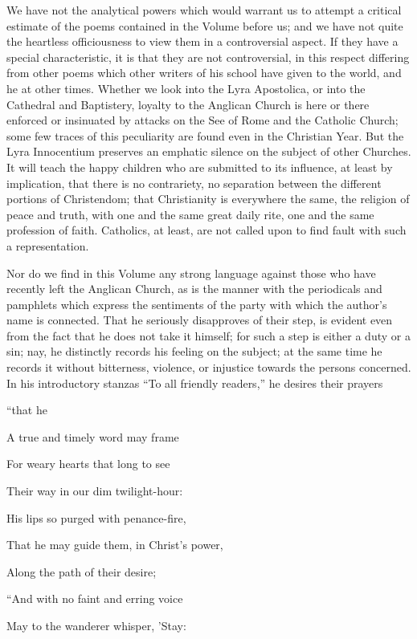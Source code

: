 We have not the analytical powers which would
warrant us to attempt a critical estimate of the poems contained in
the Volume before us; and we have not quite the heartless
officiousness to view them in a controversial aspect. If they have a
special characteristic, it is that they are not controversial, in this
respect differing from other poems which other writers of his school
have given to the world, and he at other times. Whether we look into
the Lyra Apostolica, or into the Cathedral and Baptistery, loyalty to
the Anglican Church is here or there enforced or insinuated by attacks
on the See of Rome and the Catholic Church; some few traces of this
peculiarity are found even in the Christian Year. But the Lyra
Innocentium preserves an emphatic silence on the subject of other
Churches. It will teach the happy children who are submitted to its
influence, at least by implication, that there is no contrariety, no
separation between the different portions of Christendom; that
Christianity is everywhere the same, the religion of peace and truth,
with one and the same great daily rite, one and the same profession of
faith. Catholics, at least, are not called upon to find fault with
such a representation.

Nor do we find in this Volume any strong language
against those who have recently left the Anglican Church, as is the
manner with the periodicals and pamphlets which express the sentiments
of the party with which the author's name is connected. That he
seriously disapproves of their step, is evident even from the
fact that he does not take it himself; for such a step is either a
duty or a sin; nay, he distinctly records his feeling on the subject;
at the same time he records it without bitterness, violence, or
injustice towards the persons concerned. In his introductory stanzas ``To
all friendly readers,'' he desires their prayers

``that he

A true and timely word may frame

For weary
hearts that long to see

Their way in our dim twilight-hour:

His lips so
purged with penance-fire,

That he may guide them, in Christ's power,

Along the
path of their desire;

``And with
no faint and erring voice

May to the
wanderer whisper, 'Stay:

